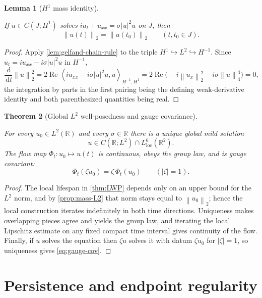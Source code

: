\documentclass[11pt,oneside]{book}
\providecommand{\uses}[1]{}
\newtheorem{theorem}{Theorem}[chapter]
\newtheorem{lemma}[theorem]{Lemma}
\theoremstyle{definition}
\theoremstyle{remark}
\newcommand{\R}{\mathbb R}
\newcommand{\1}{\mathbf 1}
\newcommand{\loc}{\mathrm{loc}}
\newcommand{\Rea}{\operatorname{Re}}
\newcommand{\dd}{\,\mathrm d}
\newcommand{\norm}[1]{\left\lVert #1\right\rVert}
\newcommand{\pair}[2]{\left\langle #1,#2\right\rangle}
\begin{document}
\begin{lemma}[$H^1$ mass identity]\label{lem:mass-H1}
\uses{lem:gelfand-chain-rule, lem:H1-persistence}
If $u\in C(J;H^1)$ solves $iu_t+u_{xx}=\sigma|u|^2u$ on $J$, then
\[
  \norm{u(t)}_2=\norm{u(t_0)}_2\qquad(t,t_0\in J).
\]
\end{lemma}

\begin{proof}
\uses{lem:gelfand-chain-rule}
Apply \cref{lem:gelfand-chain-rule} to the triple
$H^1\hookrightarrow L^2\hookrightarrow H^{-1}$. Since
$u_t=iu_{xx}-i\sigma|u|^2u$ in $H^{-1}$,
\[
 \frac{\dd}{\dd t}\norm u_2^2
 =2\Rea\pair{iu_{xx}-i\sigma|u|^2u}{u}_{H^{-1},H^1}
 =2\Rea\bigl(-i\norm{u_x}_2^2-i\sigma\norm u_4^4\bigr)=0,
\]
the integration by parts in the first pairing being the defining
weak-derivative identity and both parenthesized quantities being real.
\end{proof}

\begin{theorem}[Global $L^2$ well-posedness and gauge covariance]\label{thm:GWP}
\uses{thm:LWP, prop:mass-L2, def:fixed-point-space}
For every $u_0\in L^2(\R)$ and every $\sigma\in\R$ there is a unique global
mild solution
\[
 u\in C(\R;L^2)\cap L^6_{\loc}(\R^2).
\]
The flow map $\Phi_t:u_0\mapsto u(t)$ is continuous, obeys the group law, and
is gauge covariant:
\begin{equation}
  \Phi_t(\zeta u_0)=\zeta\,\Phi_t(u_0)\qquad(|\zeta|=1). \label{eq:gauge-cov}
\end{equation}
\end{theorem}

\begin{proof}
\uses{thm:LWP, prop:mass-L2}
The local lifespan in \cref{thm:LWP} depends only on an upper bound for the
$L^2$ norm, and by \cref{prop:mass-L2} that norm stays equal to
$\norm{u_0}_2$; hence the local construction iterates indefinitely in both
time directions. Uniqueness makes overlapping pieces agree and yields the
group law, and iterating the local Lipschitz estimate on any fixed compact
time interval gives continuity of the flow. Finally, if $u$ solves the
equation then $\zeta u$ solves it with datum $\zeta u_0$ for $|\zeta|=1$, so
uniqueness gives \eqref{eq:gauge-cov}.
\end{proof}


\chapter{Persistence and endpoint regularity}\label{chap:endpoint}
\end{document}
